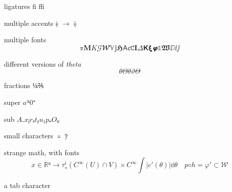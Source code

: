 \documentclass[a4paper,english]{article}
\begin{document}
ligatures ﬁ ﬃ

multiple accents ṩ \(→\)  \.{\d{s}}

multiple fonts
\[ ℼ 𝐌 𝐾 𝒢 𝓦 𝕍 𝕛 𝕳 𝖠 𝘤 𝙲 𝚰 𝛥 𝝟 𝝽 𝞿 𝟙 𝖂 ⅅ ⅈ ⅉ\]



different versions of \emph{theta}
\[\theta Θ  θ  ϑ  ϴ \]

fractions
\(¼ ⅖ \)

super \(aᴬ 0⁺\)



sub \(A₋ xⱼ rₐ tᵪ u₁ p₌ Oᵩ\)

small characters ﹦﹖

strange math, with fonts
\[𝑥 ∈ ℝ⁶→  τ_∗^ i (C ^ ∞ (U ) ∩ V) × 𝐶^ ∞  ∫ |𝑐' (𝜃)| 𝕕𝜃 \quad 𝑝◦ℎ = 𝜑' ⊂ 𝒲\]

a	tab character
\end{document}
